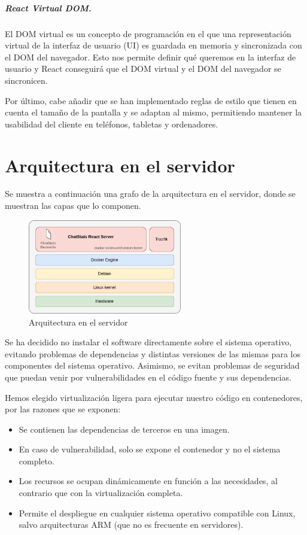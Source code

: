 \subparagraph{React Virtual DOM.} El DOM virtual es un concepto de programación en el que una representación virtual de la interfaz de usuario (UI) es guardada en memoria y sincronizada con el DOM del navegador. Esto nos permite definir qué queremos en la interfaz de usuario y React conseguirá que el DOM virtual y el DOM del navegador se sincronicen.


Por último, cabe añadir que se han implementado reglas de estilo que tienen en cuenta el tamaño de la pantalla y se adaptan al mismo, permitiendo mantener la usabilidad del cliente en teléfonos, tabletas y ordenadores.





\section{Arquitectura en el servidor}
\label{chap:architecture:server}

Se muestra a continuación una grafo de la arquitectura en el servidor, donde se muestran las capas que lo componen.

\begin{figure}[H]
	\centering
	\includegraphics[width=0.6\textwidth]{img/server.png}
	\caption{Arquitectura en el servidor}
	\label{fig:chap4:architecture_server}
\end{figure}

Se ha decidido no instalar el software directamente sobre el sistema operativo, evitando problemas de dependencias y distintas versiones de las mismas para los componentes del sistema operativo. Asimismo, se evitan problemas de seguridad que puedan venir por vulnerabilidades en el código fuente y sus dependencias.

Hemos elegido virtualización ligera para ejecutar nuestro código en contenedores, por las razones que se exponen:

\begin{itemize}
	\item Se contienen las dependencias de terceros en una imagen.
	\item En caso de vulnerabilidad, solo se expone el contenedor y no el sistema completo.
	\item Los recursos se ocupan dinámicamente en función a las necesidades, al contrario que con la virtualización completa.
	\item Permite el despliegue en cualquier sistema operativo compatible con Linux, salvo arquitecturas ARM (que no es frecuente en servidores).
\end{itemize}

